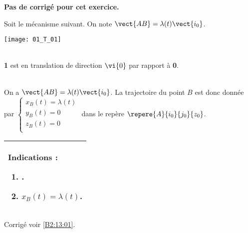 \normaltrue
\correctiontrue


\setcounter{numques}{0}
\ifcorrection
\else
\textbf{Pas de corrigé pour cet exercice.}
\fi

\ifprof
\else
Soit le mécanisme suivant. On note $\vect{AB}=\lambda(t)\vect{i_0}$.
\begin{center}
\texttt{[image: 01\_T\_01]}
\end{center}
\fi

\ifprof~\\
\textbf{1} est en translation de direction $\vi{0}$ par rapport à \textbf{0}.
\else
\fi

\ifprof~\\
On a $\vect{AB}=\lambda(t)\vect{i_0} $. La trajectoire du point $B$ est donc donnée par 
$\left\{ 
\begin{array}{l}
x_B(t) = \lambda (t) \\
y_B(t) = 0 \\
z_B(t) = 0 \\
\end{array}
\right.$ dans le repère $\repere{A}{i_0}{j_0}{z_0}$.
\else
\fi


\ifprof
\else

\footnotesize
\begin{center}
\begin{tabular}{|p{.9\linewidth}|}
\hline
Indications :
\begin{enumerate}
\item .
\item $x_B(t) = \lambda (t)$.
\end{enumerate} \\ \hline
\end{tabular}
\end{center}
\normalsize

\begin{flushright}
\footnotesize{Corrigé  voir \ref{B2:13:01}.}
\end{flushright}%
\fi


